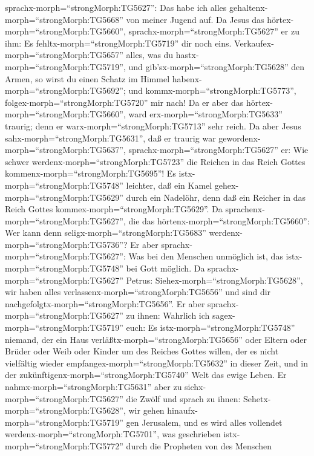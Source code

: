 sprachx-morph=``strongMorph:TG5627'': Das habe ich alles
gehaltenx-morph=``strongMorph:TG5668'' von meiner Jugend auf.
 Da Jesus das hörtex-morph=``strongMorph:TG5660'',
sprachx-morph=``strongMorph:TG5627'' er zu ihm: Es
fehltx-morph=``strongMorph:TG5719'' dir noch eins.
Verkaufex-morph=``strongMorph:TG5657'' alles, was du
hastx-morph=``strongMorph:TG5719'', und
gib'sx-morph=``strongMorph:TG5628'' den Armen, so wirst du einen Schatz
im Himmel habenx-morph=``strongMorph:TG5692''; und
kommx-morph=``strongMorph:TG5773'', folgex-morph=``strongMorph:TG5720''
mir nach!  Da er aber das
hörtex-morph=``strongMorph:TG5660'', ward
erx-morph=``strongMorph:TG5633'' traurig; denn er
warx-morph=``strongMorph:TG5713'' sehr reich.  Da aber
Jesus sahx-morph=``strongMorph:TG5631'', daß er traurig war
gewordenx-morph=``strongMorph:TG5637'',
sprachx-morph=``strongMorph:TG5627'' er: Wie schwer
werdenx-morph=``strongMorph:TG5723'' die Reichen in das Reich Gottes
kommenx-morph=``strongMorph:TG5695''!  Es
istx-morph=``strongMorph:TG5748'' leichter, daß ein Kamel
gehex-morph=``strongMorph:TG5629'' durch ein Nadelöhr, denn daß ein
Reicher in das Reich Gottes kommex-morph=``strongMorph:TG5629''.
 Da sprachenx-morph=``strongMorph:TG5627'', die das
hörtenx-morph=``strongMorph:TG5660'': Wer kann denn
seligx-morph=``strongMorph:TG5683''
werdenx-morph=``strongMorph:TG5736''?  Er aber
sprachx-morph=``strongMorph:TG5627'': Was bei den Menschen unmöglich
ist, das istx-morph=``strongMorph:TG5748'' bei Gott möglich.
 Da sprachx-morph=``strongMorph:TG5627'' Petrus:
Siehex-morph=``strongMorph:TG5628'', wir haben alles
verlassenx-morph=``strongMorph:TG5656'' und sind dir
nachgefolgtx-morph=``strongMorph:TG5656''.  Er aber
sprachx-morph=``strongMorph:TG5627'' zu ihnen: Wahrlich ich
sagex-morph=``strongMorph:TG5719'' euch: Es
istx-morph=``strongMorph:TG5748'' niemand, der ein Haus
verläßtx-morph=``strongMorph:TG5656'' oder Eltern oder Brüder oder Weib
oder Kinder um des Reiches Gottes willen,  der es nicht
vielfältig wieder empfangex-morph=``strongMorph:TG5632'' in dieser Zeit,
und in der zukünftigenx-morph=``strongMorph:TG5740'' Welt das ewige
Leben.  Er nahmx-morph=``strongMorph:TG5631'' aber zu
sichx-morph=``strongMorph:TG5627'' die Zwölf und sprach zu ihnen:
Sehetx-morph=``strongMorph:TG5628'', wir gehen
hinaufx-morph=``strongMorph:TG5719'' gen Jerusalem, und es wird alles
vollendet werdenx-morph=``strongMorph:TG5701'', was geschrieben
istx-morph=``strongMorph:TG5772'' durch die Propheten von des Menschen
